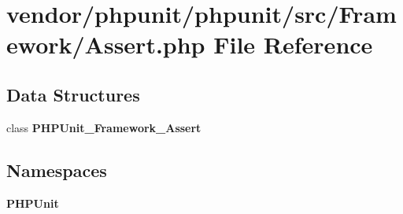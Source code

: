 \section{vendor/phpunit/phpunit/src/\+Framework/\+Assert.php File Reference}
\label{_assert_8php}
\subsection*{Data Structures}
\begin{DoxyCompactItemize}
\item 
class {\bf P\+H\+P\+Unit\+\_\+\+Framework\+\_\+\+Assert}
\end{DoxyCompactItemize}
\subsection*{Namespaces}
\begin{DoxyCompactItemize}
\item 
 {\bf P\+H\+P\+Unit}
\end{DoxyCompactItemize}

